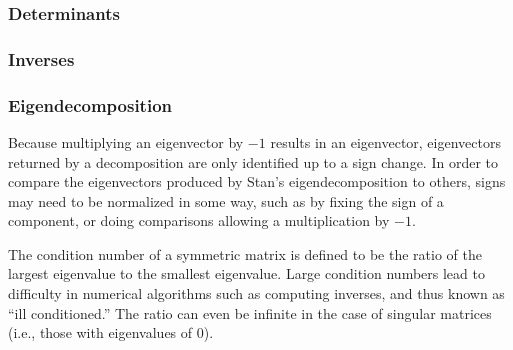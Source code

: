 \subsubsection{Determinants}

\begin{description}
%
%
\end{description}

\subsubsection{Inverses}

\begin{description}
%
%
%
\end{description}

\subsubsection{Eigendecomposition}

\begin{description}
%
%
%
\end{description}
%
Because multiplying an eigenvector by $-1$ results in an eigenvector,
eigenvectors returned by a decomposition are only identified up to a
sign change.  In order to compare the eigenvectors produced by Stan's
eigendecomposition to others, signs may need to be normalized in some
way, such as by fixing the sign of a component, or doing comparisons
allowing a multiplication by $-1$.

The condition number of a symmetric matrix is defined to be the ratio
of the largest eigenvalue to the smallest eigenvalue.  Large condition
numbers lead to difficulty in numerical algorithms such as computing
inverses, and thus known as ``ill conditioned.''  The ratio can even
be infinite in the case of singular matrices (i.e., those with
eigenvalues of 0).

